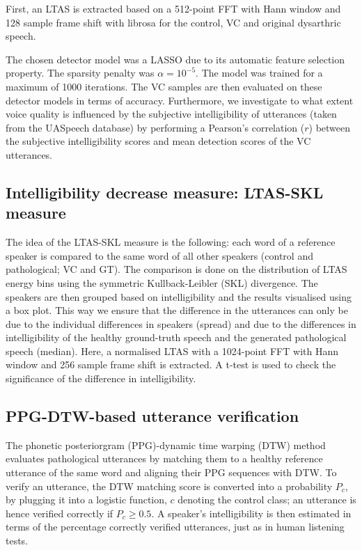 \documentclass[a4paper]{article}
\begin{document}
First, an LTAS is extracted based on a 512-point FFT with Hann window and 128 sample frame shift with librosa \cite{brian_mcfee_2020_3955228} for the control, VC and original dysarthric speech.

The chosen detector model was a LASSO due to its automatic feature selection property. The sparsity penalty was \( \alpha = 10^{-5} \). The model was trained for a maximum of 1000 iterations. The VC samples are then evaluated on these detector models in terms of accuracy. Furthermore, we investigate to what extent voice quality is influenced by the subjective intelligibility of utterances (taken from the UASpeech database) by performing a Pearson's correlation ($r$) between the subjective intelligibility scores and mean detection scores of the VC utterances.

\subsection{Intelligibility decrease measure: LTAS-SKL measure}
\label{sec:ltas-skl}

The idea of the LTAS-SKL measure is the following: each word of a reference speaker is compared to the same word of all other speakers (control and pathological; VC and GT). The comparison is done on the distribution of LTAS energy bins using the symmetric Kullback-Leibler (SKL) divergence. The speakers are then grouped based on intelligibility and the results visualised using a box plot. This way we ensure that the difference in the utterances can only be due to the individual differences in speakers (spread) and due to the differences in intelligibility of the healthy ground-truth speech and the generated pathological speech (median). Here, a normalised LTAS with a 1024-point FFT with Hann window and 256 sample frame shift is extracted. 
A t-test is used to check the significance  of the difference in intelligibility.

\subsection{PPG-DTW-based utterance verification}
\label{sec:ppg-dtw}

The phonetic posteriorgram (PPG)-dynamic time warping (DTW) method~\cite{Fritsch_Idiap-RR-01-2021} evaluates pathological utterances by matching them to a healthy reference utterance of the same word and aligning their PPG sequences with DTW. To verify an utterance, the DTW matching score is converted into a probability $P_c$, by plugging it into a logistic function, $c$ denoting the control class; an utterance is hence verified correctly if $P_c \ge 0.5$. A speaker's intelligibility is then estimated in terms of the percentage correctly verified utterances, just as in human listening tests.
\end{document}
